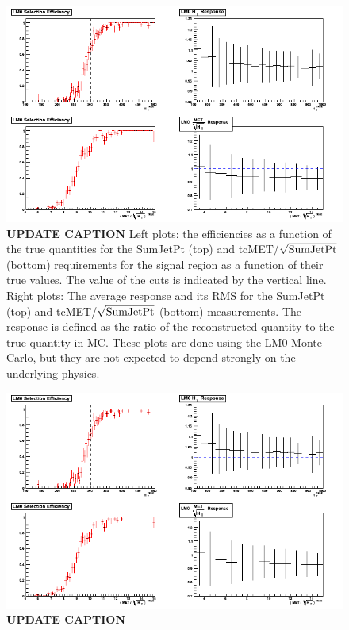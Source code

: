 \begin{figure}[tbh]
\begin{center}
\includegraphics[width=\linewidth]{selectionEffDec10.png}
\caption{\label{fig:response} 
{\bf UPDATE CAPTION}
Left plots: the efficiencies
as a function of the true quantities for the SumJetPt (top) and
tcMET/$\sqrt{\rm SumJetPt}$ (bottom) requirements for the signal 
region as a function of their true values.  The value of the 
cuts is indicated by the vertical line.
Right plots: The average response and its RMS for the SumJetPt
(top) and tcMET/$\sqrt{\rm SumJetPt}$ (bottom) measurements.
The response is defined as the ratio of the reconstructed quantity
to the true quantity in MC.  These plots are done using the LM0
Monte Carlo, but they are not expected to depend strongly on 
the underlying physics.
}
\end{center}
\end{figure}

\begin{figure}[tbh]
\begin{center}
\includegraphics[width=\linewidth]{selectionEffDec10.png}
\caption{\label{fig:leptoneff} 
{\bf UPDATE CAPTION}
}
\end{center}
\end{figure}

